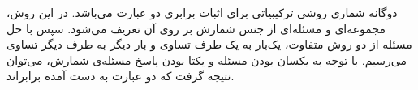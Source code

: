 \p
دوگانه شماری روشی ترکیبیاتی برای اثبات برابری دو عبارت می‌باشد.
در این روش، مجموعه‌ای و مسئله‌ای از جنس شمارش بر روی آن تعریف می‌شود.
سپس با حل مسئله از دو روش متفاوت، یک‌بار به یک طرف تساوی و بار دیگر
به طرف دیگر تساوی می‌رسیم.
با توجه به یکسان بودن مسئله و یکتا بودن پاسخ مسئله‌ی شمارش،
می‌توان نتیجه گرفت که دو عبارت به دست آمده برابراند.

\begin{PROBLEM}


\SOLUTION{}
\end{PROBLEM}